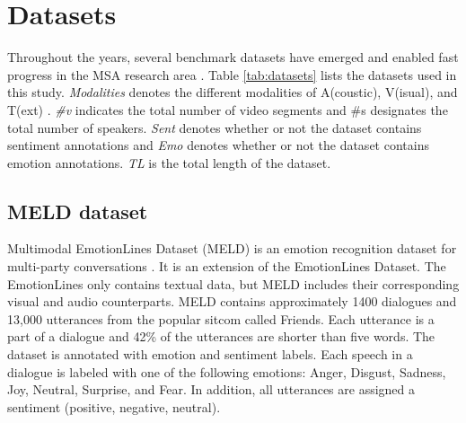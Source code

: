 \section{Datasets}
\label{sec:datasets}
Throughout the years, several benchmark datasets have emerged and enabled fast progress in the MSA research area \cite{COGMEN_joshi-etal-2022-cogmen}.  Table \ref{tab:datasets} lists the datasets used in this study. \textit{Modalities} denotes the different modalities of A(coustic), V(isual), and T(ext) \cite{HP_RPP} \cite{HP_Advanced}. \textit{\#v} indicates the total number of video segments and \#s designates the total number of speakers. \textit{Sent} denotes whether or not the dataset contains sentiment annotations and \textit{Emo} denotes whether or not the dataset contains emotion annotations. \textit{TL} is the total length of the dataset. 
%
\begin{table}[h]
\caption{Benchmark MSA datasets used in the thesis.}
\centering
{}
\label{tab:datasets}
\end{table}

\subsection{MELD dataset}
Multimodal EmotionLines Dataset (MELD) is an emotion recognition dataset for multi-party conversations \cite{meld_dataset} \cite{HP_Advanced}. It is an extension of the EmotionLines Dataset. The EmotionLines only contains textual data, but MELD includes their corresponding visual and audio counterparts. MELD contains approximately 1400 dialogues and 13,000 utterances from the popular sitcom called Friends. Each utterance is a part of a dialogue and 42\% of the utterances are shorter than five words. The dataset is annotated with emotion and sentiment labels. Each speech in a dialogue is labeled with one of the following emotions: Anger, Disgust, Sadness, Joy, Neutral, Surprise, and Fear. In addition, all utterances are assigned a sentiment (positive, negative, neutral). 

